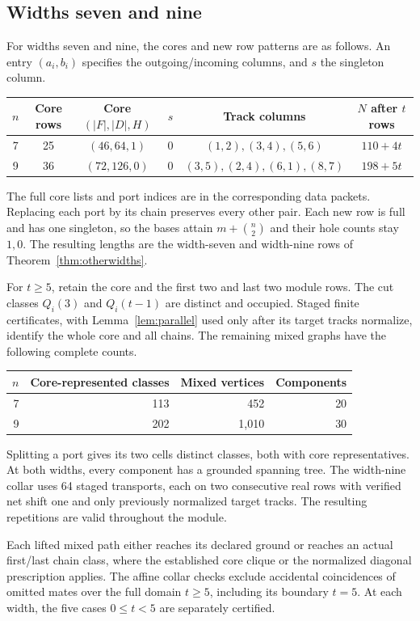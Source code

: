\documentclass[11pt,a4paper]{article}
\theoremstyle{definition}
\begin{document}
\subsection{Widths seven and nine}

For widths seven and nine, the cores and new row patterns are
as follows. An entry $(a_i,b_i)$ specifies the outgoing/incoming
columns, and $s$ the singleton column.
\begin{center}
\begin{tabular}{cccccc}
\toprule
$n$&Core rows&Core $(|F|,|D|,H)$&$s$&Track columns&$N$ after $t$ rows\\
\midrule
7&25&$(46,64,1)$&0&$(1,2),(3,4),(5,6)$&$110+4t$\\
9&36&$(72,126,0)$&0&$(3,5),(2,4),(6,1),(8,7)$&$198+5t$\\
\bottomrule
\end{tabular}
\end{center}
The full core lists and port indices are in the corresponding data
packets. Replacing each port by its chain preserves every other pair.
Each new row is full and has one singleton, so the bases attain
$m+\binom n2$ and their hole counts stay $1,0$. The resulting
lengths are the width-seven and width-nine rows of
Theorem~\ref{thm:otherwidths}.

For $t\ge5$, retain the core and the first two and last two module
rows. The cut classes $Q_i(3)$ and $Q_i(t-1)$ are distinct and occupied.
Staged finite certificates, with Lemma~\ref{lem:parallel} used only
after its target tracks normalize, identify the whole core and all
chains. The remaining mixed graphs have the following complete counts.
\begin{center}
\begin{tabular}{rrrr}
\toprule
$n$&Core-represented classes&Mixed vertices&Components\\
\midrule
7&113&452&20\\
9&202&1,010&30\\
\bottomrule
\end{tabular}
\end{center}
Splitting a port gives its two cells distinct classes, both with core
representatives. At both widths, every component has a grounded spanning tree. The width-nine collar
uses 64 staged transports, each on two consecutive real rows with
verified net shift one and only previously normalized target tracks.
The resulting repetitions are valid throughout the module.

Each lifted mixed path either reaches its declared ground or reaches
an actual first/last chain class, where the established core clique
or the normalized diagonal prescription applies. The affine collar checks exclude accidental coincidences of omitted
mates over the full domain $t\ge5$, including its boundary $t=5$.
At each width, the five cases $0\le t<5$ are separately certified.
\end{document}
